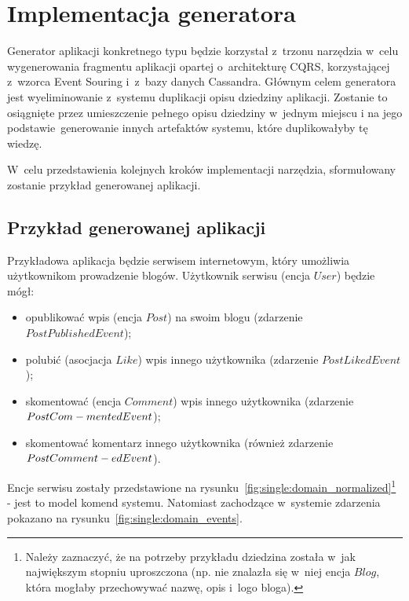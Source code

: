 \chapter{Implementacja generatora} \label{chap:implementation:single_type}

Generator aplikacji konkretnego typu będzie korzystał z~trzonu narzędzia w~celu wygenerowania fragmentu aplikacji opartej o~architekturę CQRS, korzystającej z~wzorca Event Souring i~z~bazy danych Cassandra.
Głównym celem generatora jest wyeliminowanie z~systemu duplikacji opisu dziedziny aplikacji.
Zostanie to osiągnięte przez umieszczenie pełnego opisu dziedziny w~jednym miejscu i na jego podstawie~generowanie innych artefaktów systemu, które duplikowałyby tę wiedzę.

W~celu przedstawienia kolejnych kroków implementacji narzędzia, sformułowany zostanie przykład generowanej aplikacji.



\section{Przykład generowanej aplikacji}

Przykładowa aplikacja będzie serwisem internetowym, który umożliwia użytkownikom prowadzenie blogów.
Użytkownik serwisu (encja $User$) będzie mógł:

\begin{itemize}
 \item opublikować wpis (encja $Post$) na swoim blogu (zdarzenie $PostPublishedEvent$);
 \item polubić (asocjacja $Like$) wpis innego użytkownika (zdarzenie $PostLikedEvent$);
 \item skomentować (encja $Comment$) wpis innego użytkownika (zdarzenie $PostCom-\\mentedEvent$);
 \item skomentować komentarz innego użytkownika (również zdarzenie $PostComment-\\edEvent$).
\end{itemize}

Encje serwisu zostały przedstawione na rysunku~\ref{fig:single:domain_normalized}\footnote{Należy zaznaczyć, że na potrzeby przykładu dziedzina została w~jak największym stopniu uproszczona (np. nie znalazła się w~niej encja $Blog$, która mogłaby przechowywać nazwę, opis i~logo bloga).} - jest to model komend systemu.
Natomiast zachodzące w~systemie zdarzenia pokazano na rysunku~\ref{fig:single:domain_events}.

